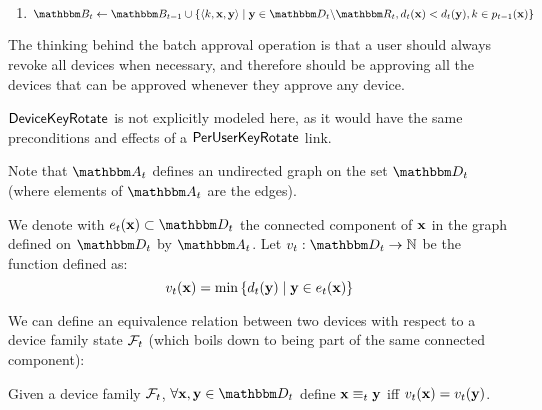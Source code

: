 \begin{definition}
\begin{enumerate}
\begin{itemize}
\begin{enumerate}
          \label{e:approve:add_to_a}
          \label{e:approve:devices}
        \item $\zset{b}_{t} \leftarrow \zset{b}_{t-1} \cup \left\{ \langle \zkey{k}, \zdev{x},
          \zdev{y} \rangle \;|\; \zdev{y} \in \zset{d}_{t} \setsub \zset{r}_{t},
          \zdevtime_t(\zdev{x}) < \zdevtime_t(\zdev{y}), \zkey{k} \in \zpuks_{t-1}(\zdev{x})
          \right\}$
          \label{e:approve:box}
     \end{enumerate}
   \end{itemize}
\end{enumerate}
\end{definition}

The thinking behind the batch approval operation is that a user should always revoke all devices
when necessary, and therefore should be approving all the devices that can be approved whenever they
approve any device.

$\mathsf{DeviceKeyRotate}{}$ is not explicitly modeled here, as it would have the same preconditions and
effects of a $\mathsf{PerUserKeyRotate}{}$ link.

Note that $\zset{a}_t$ defines an undirected graph on the set $\zset{D}_t$ (where elements of
$\zset{a}_t$ are the edges). 

\begin{definition}
  We denote with $\zeq_t(\zdev{x}) \subset \zset{D}_t$ the connected component of $\mathbf{x}$ in the
  graph defined on $\zset{D}_t$ by $\zset{A}_t$. Let $\zverif_t : \zset{d}_t \rightarrow \integers$
  be the function defined as:
  \[
  v_{t}(\mathbf{x}) = \min \left\{
    d_t(\mathbf{y})  
    \;|\; \mathbf{y}  \in e_t(\mathbf{x}) 
    \right\}
  \]
\end{definition}

We can define an equivalence relation between two devices with respect to a device family state
$\mathcal{F}_{t}$ (which boils down to being part of the same connected component):

\begin{definition}
  Given a device family $\mathcal{F}_{t}$, $\forall \zdev{x},\zdev{y} \in \zset{D}_t$ define $\mathbf{x}
  \equiv_{t} \mathbf{y}$ iff $v_t(\mathbf{x}) = v_t(\mathbf{y})$.
\end{definition}

